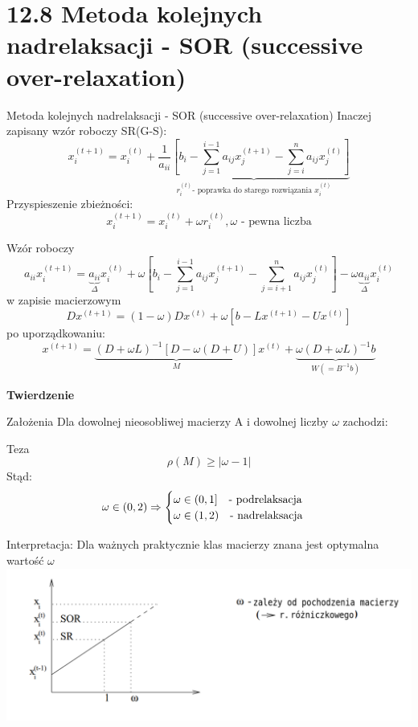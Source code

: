 \section{12.8 Metoda kolejnych nadrelaksacji - SOR (successive over-relaxation)}

\begin{frame}{Metoda kolejnych nadrelaksacji - SOR (successive over-relaxation)}
  Inaczej zapisany wzór roboczy SR(G-S):
$$x^{(t+1)}_{i}=x^{(t)}_{i} + \underbrace{\frac{1}{a_{ii}}[b_i-\sum^{i-1}_{j=1} a_{ij} x^{(t+1)}_j -\sum^{n}_{j=i} a_{ij} x^{(t)}_j ]}_{r^{(t)}_i \text{- poprawka do starego rozwiązania } x^{(t)}_i}$$
  Przyspieszenie zbieżności:
  $$\boxed{x^{(t+1)}_{i}=x^{(t)}_{i}+\omega r^{(t)}_{i}}, \text{$\omega$ - pewna liczba}$$
\end{frame}

\begin{frame}
  Wzór roboczy
  $$a_{ii}x^{(t+1)}_{i}=\underbrace{a_{ii}}_{\Delta}x^{(t)}_{i}+\omega[b_i-\sum^{i-1}_{j=1}a_{ij}x^{(t+1)}_{j}-\sum^{n}_{j=i+1}a_{ij}x^{(t)}_{j}]-\omega\underbrace{a_{ii}}_{\Delta}x^{(t)}_{i}$$
  w zapisie macierzowym
  $$Dx^{(t+1)}=(1-\omega )Dx^{(t)}+\omega [b-Lx^{(t+1)}-Ux^{(t)}]$$
  po uporządkowaniu:
  $$x^{(t+1)}=\underbrace{(D+\omega L)^{-1}[D-\omega (D+U)]}_{M}x^{(t)}+\underbrace{\omega(D+\omega L)^{-1}b}_{W(=B^{-1}b)}$$
\end{frame}

\begin{frame}{}
  \textbf{Twierdzenie}
  \begin{block}{Założenia}
    Dla dowolnej nieosobliwej macierzy A i dowolnej liczby $\omega$ zachodzi:
  \end{block}
  \begin{block}{Teza}
    $$\rho(M)\geq |\omega -1|$$
    Stąd:
    $$
    \omega\in(0,2) \Rightarrow
    \begin{cases}
      \omega\in{(0,1]}\text{\quad- podrelaksacja}\\
      \omega\in{(1,2)}\text{\quad- nadrelaksacja}
    \end{cases}
    $$
  \end{block}
\end{frame}

\begin{frame}{}
  Interpretacja:
  Dla ważnych praktycznie klas macierzy znana jest optymalna wartość $\omega$
  \includegraphics[height=0.6\textheight, width=1\textwidth]{img/12/iteracja2}
\end{frame}

